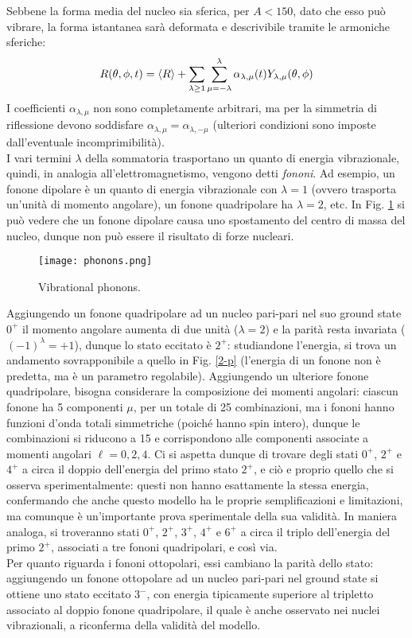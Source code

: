 Sebbene la forma media del nucleo sia sferica, per $ A < 150 $, dato che esso può vibrare, la forma istantanea sarà deformata e descrivibile tramite le armoniche sferiche:
\begin{equation}
	R(\theta,\phi,t) = \braket{R} + \sum_{\lambda \ge 1} \sum_{\mu = -\lambda}^{\lambda} \alpha_{\lambda,\mu}(t) Y_{\lambda,\mu}(\theta,\phi)
	\label{eq:5.11}
\end{equation}
I coefficienti $ \alpha_{\lambda,\mu} $ non sono completamente arbitrari, ma per la simmetria di riflessione devono soddisfare $ \alpha_{\lambda,\mu} = \alpha_{\lambda,-\mu} $ (ulteriori condizioni sono imposte dall'eventuale incomprimibilità).\\
I vari termini $ \lambda $ della sommatoria trasportano un quanto di energia vibrazionale, quindi, in analogia all'elettromagnetismo, vengono detti \textit{fononi}. Ad esempio, un fonone dipolare è un quanto di energia vibrazionale con $ \lambda = 1 $ (ovvero trasporta un'unità di momento angolare), un fonone quadripolare ha $ \lambda = 2 $, etc. In Fig. \ref{phon} si può vedere che un fonone dipolare causa uno spostamento del centro di massa del nucleo, dunque non può essere il risultato di forze nucleari.

\begin{figure}[!t]
	\centering
	\texttt{[image: phonons.png]}
	\caption{Vibrational phonons.}
	\label{phon}
\end{figure}

Aggiungendo un fonone quadripolare ad un nucleo pari-pari nel suo ground state $ 0^+ $ il momento angolare aumenta di due unità ($ \lambda = 2 $) e la parità resta invariata ($ (-1)^{\lambda} = +1 $), dunque lo stato eccitato è $ 2^+ $: studiandone l'energia, si trova un andamento sovrapponibile a quello in Fig. \ref{2-p} (l'energia di un fonone non è predetta, ma è un parametro regolabile). Aggiungendo un ulteriore fonone quadripolare, bisogna considerare la composizione dei momenti angolari: ciascun fonone ha 5 componenti $ \mu $, per un totale di 25 combinazioni, ma i fononi hanno funzioni d'onda totali simmetriche (poiché hanno spin intero), dunque le combinazioni si riducono a 15 e corrispondono alle componenti associate a momenti angolari $ \ell = 0,2,4 $. Ci si aspetta dunque di trovare degli stati $ 0^+ $, $ 2^+ $ e $ 4^+ $ a circa il doppio dell'energia del primo stato $ 2^+ $, e ciò e proprio quello che si osserva sperimentalmente: questi non hanno esattamente la stessa energia, confermando che anche questo modello ha le proprie semplificazioni e limitazioni, ma comunque è un'importante prova sperimentale della sua validità. In maniera analoga, si troveranno stati $ 0^+ $, $ 2^+ $, $ 3^+ $, $ 4^+ $ e $ 6^+ $ a circa il triplo dell'energia del primo $ 2^+ $, associati a tre fononi quadripolari, e così via.\\
Per quanto riguarda i fononi ottopolari, essi cambiano la parità dello stato: aggiungendo un fonone ottopolare ad un nucleo pari-pari nel ground state si ottiene uno stato eccitato $ 3^- $, con energia tipicamente superiore al tripletto associato al doppio fonone quadripolare, il quale è anche osservato nei nuclei vibrazionali, a riconferma della validità del modello.

